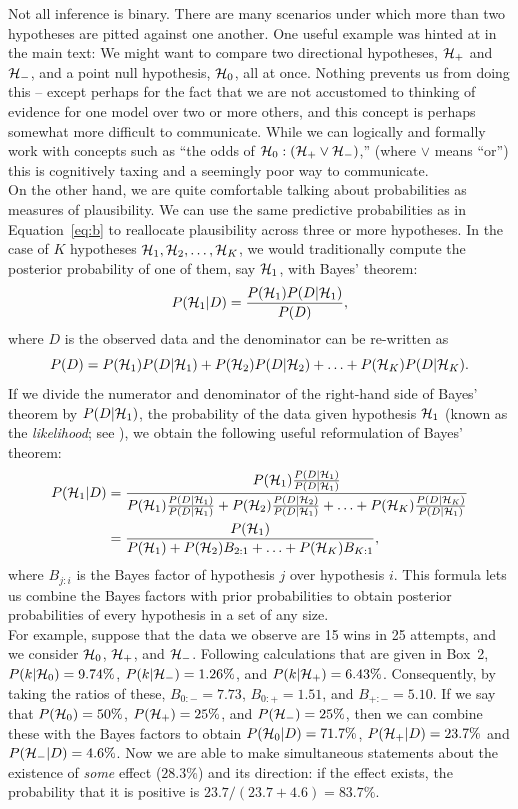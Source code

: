 \begin{tcolorbox}[title=Box~1: Evaluating more than two hypotheses at once,code={\singlespacing}]
Not all inference is binary.  There are many scenarios under which more than two hypotheses are pitted against one another.  One useful example was hinted at in the main text: We might want to compare two directional hypotheses, ${\mathcal{H}}_+$ and ${\mathcal{H}}_-$, and a point null hypothesis, ${\mathcal{H}}_0$, all at once.  Nothing prevents us from doing this -- except perhaps for the fact that we are not accustomed to thinking of evidence for one model over two or more others, and this concept is perhaps somewhat more difficult to communicate.  While we can logically and formally work with concepts such as ``the odds of ${\mathcal{H}}_0 : ({\mathcal{H}}_+ \lor {\mathcal{H}}_-)$,'' (where $\lor$ means ``or'') this is cognitively taxing and a seemingly poor way to communicate.\\[-1ex]

On the other hand, we are quite comfortable talking about probabilities as measures of plausibility. We can use the same predictive probabilities as in Equation~\ref{eq:b} to reallocate plausibility across three or more hypotheses. In the case of $K$ hypotheses ${\mathcal{H}}_1, {\mathcal{H}}_2, \ldots, {\mathcal{H}}_K$, we would traditionally compute the posterior probability of one of them, say ${\mathcal{H}}_1$, with Bayes' theorem: $$P({\mathcal{H}}_1|D) = \frac{P({\mathcal{H}}_1)P(D|{\mathcal{H}}_1)}{P(D)},$$ where $D$ is the observed data and the denominator can be re-written as $$P(D) = P({\mathcal{H}}_1)P(D|{\mathcal{H}}_1)+P({\mathcal{H}}_2)P(D|{\mathcal{H}}_2)+\ldots+P({\mathcal{H}}_K)P(D|{\mathcal{H}}_K).$$ If we divide the numerator and denominator of the right-hand side of Bayes' theorem by $P(D|{\mathcal{H}}_1)$, the probability of the data given hypothesis ${\mathcal{H}}_1$ (known as the \textit{likelihood}; see ), we obtain the following useful reformulation of Bayes' theorem: 
\begin{align*}
P({\mathcal{H}}_1 | D) &= \frac{P({\mathcal{H}}_1) \frac{P(D|{\mathcal{H}}_1)}{P(D|{\mathcal{H}}_1)} }{P({\mathcal{H}}_1)\frac{P(D|{\mathcal{H}}_1)}{P(D|{\mathcal{H}}_1)} + P({\mathcal{H}}_2) \frac{P(D|{\mathcal{H}}_2)}{P(D|{\mathcal{H}}_1)} + \ldots + P({\mathcal{H}}_K) \frac{P(D|{\mathcal{H}}_K)}{P(D|{\mathcal{H}}_1)}}\\
&= \frac{P({\mathcal{H}}_1)}{P({\mathcal{H}}_1) + P({\mathcal{H}}_2) B_{2:1} + \ldots + P({\mathcal{H}}_K) B_{K:1}},
\end{align*}
where $B_{j:i}$ is the Bayes factor of hypothesis $j$ over hypothesis $i$. This formula lets us combine the Bayes factors with prior probabilities to obtain posterior probabilities of every hypothesis in a set of any size.\\[-1ex]

For example, suppose that the data we observe are 15 wins in 25 attempts, and we consider ${\mathcal{H}}_0$, ${\mathcal{H}}_+$, and ${\mathcal{H}}_-$.  Following calculations that are given in Box~2, $P(k|{\mathcal{H}}_0) = 9.74\%$, $P(k|{\mathcal{H}}_-) = 1.26\%$, and $P(k|{\mathcal{H}}_+) = 6.43\%$.  Consequently, by taking the ratios of these, $B_{0:-}=7.73$, $B_{0:+}=1.51$, and $B_{+:-}=5.10$.  If we say that $P({\mathcal{H}}_0) = 50\%$, $P({\mathcal{H}}_+) = 25\%$, and $P({\mathcal{H}}_-) = 25\%$, then we can combine these with the Bayes factors to obtain $P({\mathcal{H}}_0 | D) = 71.7\%$, $P({\mathcal{H}}_+ | D) = 23.7\%$ and $P({\mathcal{H}}_- | D) = 4.6\%$.  Now we are able to make simultaneous statements about the existence of \emph{some} effect ($28.3\%$) and its direction: if the effect exists, the probability that it is positive is $23.7/(23.7+4.6) = 83.7\%$.
\end{tcolorbox}

